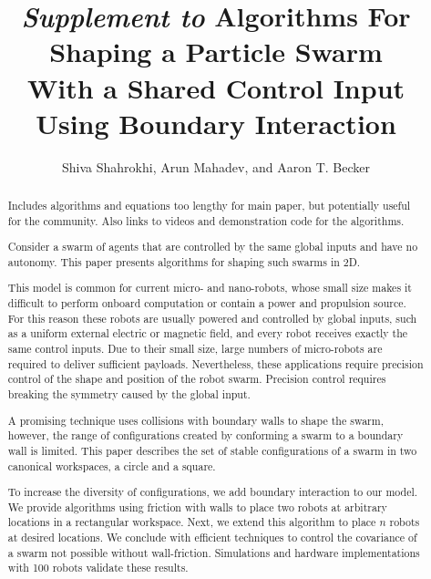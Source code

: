 \documentclass[conference]{IEEEtran}
\begin{document}
\title{\huge{ \emph{Supplement to} 
Algorithms For Shaping a Particle Swarm\\ With a Shared Control Input Using Boundary Interaction}}

\author{Shiva Shahrokhi, Arun Mahadev, and Aaron T. Becker}


\maketitle

\begin{abstract}
Includes algorithms and equations too lengthy for main paper, but potentially useful for the community.
Also links to videos and demonstration code for the algorithms.

Consider a swarm of agents that are controlled by the same global inputs and have no autonomy. This paper presents algorithms for shaping such swarms in 2D.

This model is common for current micro- and nano-robots, whose small size makes it difficult to perform onboard computation or contain a power and propulsion source. For this reason these robots are usually powered and controlled by global inputs, such as a uniform external electric or magnetic field, and every robot receives exactly the same control inputs.
Due to their small size, large numbers of micro-robots are required to deliver sufficient payloads.
 Nevertheless, these applications require precision control of the shape and position of the robot swarm. Precision control requires breaking the symmetry caused by the global input.  

A promising technique uses collisions with boundary walls to shape the swarm, however, the range of configurations created by conforming a swarm to a boundary wall is limited. This paper describes the set of stable configurations of a swarm in two canonical workspaces, a circle and a square. 

To increase the diversity of configurations, we add boundary interaction to our model.  We provide algorithms using friction with walls to place two robots at arbitrary locations in a rectangular workspace.
Next, we extend this algorithm to place $n$ robots at desired locations. We conclude with efficient techniques to control the covariance of a swarm not possible without wall-friction. Simulations and hardware implementations with 100 robots validate these results.

\end{abstract}
\end{document}
